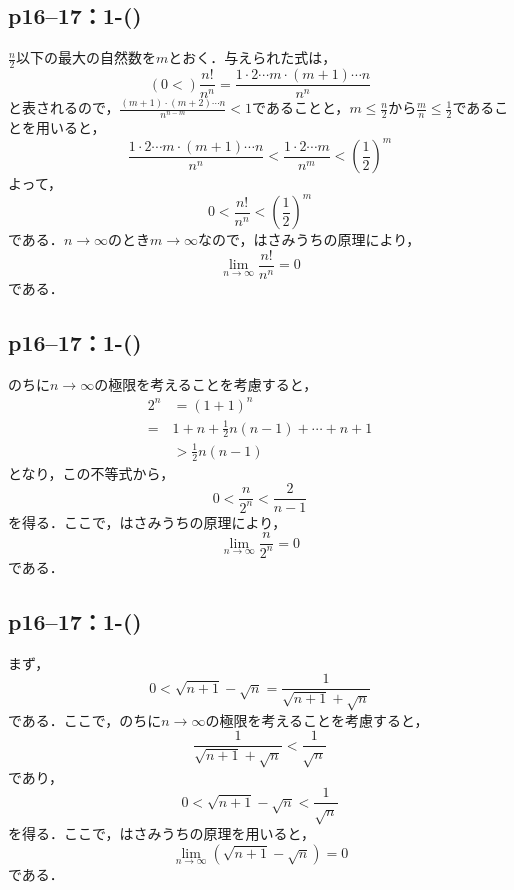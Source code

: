 \documentclass[a4paper,10pt,fleqn]{ltjsarticle}
\begin{document}
\subsection*{p16--17：1-()}

\begin{tleftbar}
    $\frac{n}{2}$以下の最大の自然数を$m$とおく．与えられた式は，
    \[
        \left( 0  < \right) \frac{n!}{n^n}  = \frac{1 \cdot 2 \dotsm m \cdot (m+1) \dotsm n}{n^n}
    \]
    と表されるので，$\frac{(m+1) \cdot (m+2) \dotsm n}{n^{n-m}} <1$であることと，$m \le \frac{n}{2}$から$\frac{m}{n} \le \frac{1}{2}$であることを用いると，
    \[
        \frac{1 \cdot 2 \dotsm m \cdot (m+1) \dotsm n}{n^n} < \frac{1 \cdot 2 \dotsm m}{n^m} <\left(\frac{1}{2}\right)^m
    \]
    よって，
    \[
        0 < \frac{n!}{n^n} <\left(\frac{1}{2}\right)^m
    \]
    である．$n \to \infty$のとき$m \to \infty$なので，はさみうちの原理により，
    \[
        \lim_{n \to \infty}\frac{n!}{n^n} =0
    \]
    である．
\end{tleftbar}
\subsection*{p16--17：1-()}
\begin{tleftbar}
    のちに$n \to \infty$の極限を考えることを考慮すると，
    \begin{align*}
        2^n & = (1+1)^n                            \\
        =   & 1+n +\frac{1}{2} n(n-1)+ \cdots +n+1 \\
            & > \frac{1}{2} n(n-1)
    \end{align*}
    となり，この不等式から，
    \[
        0< \frac{n}{2^n} < \frac{2}{n-1}
    \]
    を得る．ここで，はさみうちの原理により，
    \[
        \lim_{n \to \infty} \frac{n}{2^n}=0
    \]
    である．
\end{tleftbar}

\subsection*{p16--17：1-()}
\begin{tleftbar}
    まず，
    \[
        0<\sqrt{n+1} - \sqrt{n} = \frac{1}{\sqrt{n+1} + \sqrt{n}}
    \]
    である．ここで，のちに$n \to \infty$の極限を考えることを考慮すると，
    \[
        \frac{1}{\sqrt{n+1} + \sqrt{n}} < \frac{1}{\sqrt{n}}
    \]
    であり，
    \[
        0< \sqrt{n+1} - \sqrt{n} <\frac{1}{\sqrt{n}}
    \]
    を得る．ここで，はさみうちの原理を用いると，
    \[
        \lim_{n \to \infty} (\sqrt{n+1} - \sqrt{n} )=0
    \]
    である．
\end{tleftbar}
\end{document}
